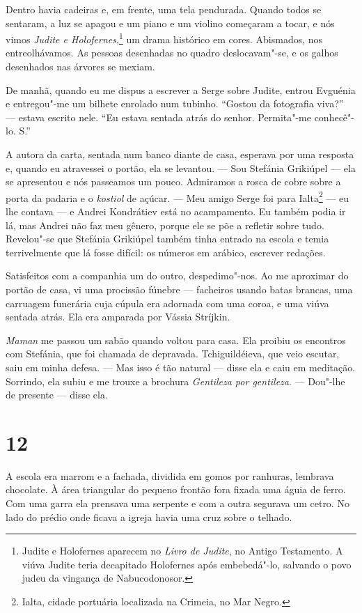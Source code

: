 Dentro havia cadeiras e, em frente, uma tela pendurada. Quando todos se
sentaram, a luz se apagou e um piano e um violino começaram a tocar, e
nós vimos \emph{Judite e Holofernes},\footnote{Judite e Holofernes
  aparecem no \emph{Livro de Judite}, no Antigo Testamento. A viúva
  Judite teria decapitado Holofernes após embebedá"-lo, salvando o povo
  judeu da vingança de Nabucodonosor.} um drama histórico em cores.
Abismados, nos entreolhávamos. As pessoas desenhadas no quadro
deslocavam"-se, e os galhos desenhados nas árvores se mexiam.

De manhã, quando eu me dispus a escrever a Serge sobre Judite, entrou
Evguénia e entregou"-me um bilhete enrolado num tubinho. ``Gostou da
fotografia viva?'' --- estava escrito nele. ``Eu estava sentada atrás do
senhor. Permita"-me conhecê"-lo. S.''

A autora da carta, sentada num banco diante de casa, esperava por uma
resposta e, quando eu atravessei o portão, ela se levantou. --- Sou
Stefánia Grikiúpel --- ela se apresentou e nós passeamos um pouco.
Admiramos a rosca de cobre sobre a porta da padaria e o \emph{kostiol}
de açúcar. --- Meu amigo Serge foi para Ialta\footnote{Ialta, cidade
  portuária localizada na Crimeia, no Mar Negro.} --- eu lhe contava ---
e Andrei Kondrátiev está no acampamento. Eu também podia ir lá, mas
Andrei não faz meu gênero, porque ele se põe a refletir sobre tudo.
Revelou"-se que Stefánia Grikiúpel também tinha entrado na escola e temia
terrivelmente que lá fosse difícil: os números em arábico, escrever
redações.

Satisfeitos com a companhia um do outro, despedimo"-nos. Ao me aproximar
do portão de casa, vi uma procissão fúnebre --- facheiros usando batas
brancas, uma carruagem funerária cuja cúpula era adornada com uma coroa,
e uma viúva sentada atrás. Ela era amparada por Vássia Stríjkin.

\emph{Maman} me passou um sabão quando voltou para casa. Ela proibiu os
encontros com Stefánia, que foi chamada de depravada. Tchiguildéieva,
que veio escutar, saiu em minha defesa. --- Mas isso é tão natural ---
disse ela e caiu em meditação. Sorrindo, ela subiu e me trouxe a
brochura \emph{Gentileza por gentileza}. --- Dou"-lhe de presente ---
disse ela.

\section{12}

A escola era marrom e a fachada, dividida em gomos por ranhuras,
lembrava chocolate. À área triangular do pequeno frontão fora fixada uma
águia de ferro. Com uma garra ela prensava uma serpente e com a outra
segurava um cetro. No lado do prédio onde ficava a igreja havia uma cruz
sobre o telhado.

